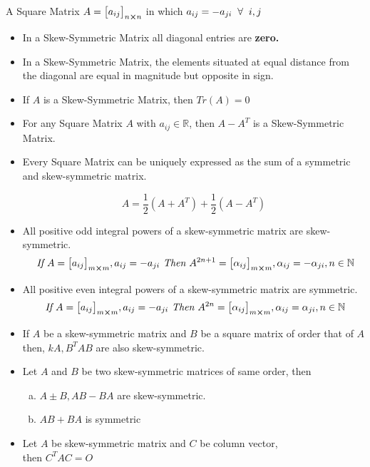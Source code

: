 \documentclass{article}
\begin{document}
A Square Matrix $A={\begin{bmatrix}
        a_{ij}
    \end{bmatrix}}_{n \cross n} $ in which $a_{ij}=-a_{ji} \hspace{2mm} \forall \hspace{2mm} i,j$
\begin{itemize}
    \item In a Skew-Symmetric Matrix all diagonal entries are \textbf{zero.}
    \item In a Skew-Symmetric Matrix, the elements situated at equal distance from the diagonal are equal in magnitude but opposite in sign.
    \item If $A$ is a Skew-Symmetric Matrix, then $Tr(A)=0$
    \item For any Square Matrix $A$ with $a_{ij}\in \mathbb{R} $, then $A-A^T$ is a Skew-Symmetric Matrix.
    \item Every Square Matrix can be uniquely expressed as the sum of a symmetric and skew-symmetric matrix.

          $$A=\dfrac{1}{2} \left(A+A^T\right)+\dfrac{1}{2} \left(A-A^T\right)$$
    \item All positive odd integral powers of a skew-symmetric matrix are skew-symmetric.
          $$\textit{ If } A={\begin{bmatrix}
                  a_{ij}
              \end{bmatrix}}_{m \cross m}, a_{ij}=-a_{ji} \textit{ Then } A^{2n+1}={\begin{bmatrix}
                          \alpha_{ij}
                      \end{bmatrix}}_{m \cross m}, \alpha_{ij}=-\alpha_{ji}, n\in \mathbb{N} $$
    \item All positive even integral powers of a skew-symmetric matrix are symmetric.
          $$\textit{ If } A={\begin{bmatrix}
                  a_{ij}
              \end{bmatrix}}_{m \cross m}, a_{ij}=-a_{ji} \textit{ Then } A^{2n}={\begin{bmatrix}
                          \alpha_{ij}
                      \end{bmatrix}}_{m \cross m}, \alpha_{ij}=\alpha_{ji}, n \in \mathbb{N}  $$
    \item If $A$ be a skew-symmetric matrix and $B$ be a square matrix of order that of $A$ then, $kA, B^TAB$ are also skew-symmetric.
    \item Let $A$ and $B$ be two skew-symmetric matrices of same order, then
          \begin{enumerate}[a.]
              \item $A \pm B, AB-BA $ are skew-symmetric.
              \item $AB+BA$ is symmetric
          \end{enumerate}
    \item Let $A$ be skew-symmetric matrix and $C$ be column vector, \\then $C^TAC=O$
\end{itemize}
\end{document}
